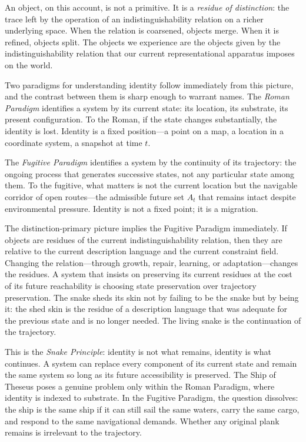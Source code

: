 \documentclass[12pt, letterpaper]{article}
\theoremstyle{remark}
\begin{document}
An object, on this account, is not a primitive.  It is a \emph{residue of
distinction}: the trace left by the operation of an indistinguishability
relation on a richer underlying space.  When the relation is coarsened,
objects merge.  When it is refined, objects split.  The objects we
experience are the objects given by the indistinguishability relation that
our current representational apparatus imposes on the world.

Two paradigms for understanding identity follow immediately from this
picture, and the contrast between them is sharp enough to warrant names.
The \emph{Roman Paradigm} identifies a system by its current state: its
location, its substrate, its present configuration.  To the Roman, if the
state changes substantially, the identity is lost.  Identity is a fixed
position---a point on a map, a location in a coordinate system, a snapshot
at time $t$.

The \emph{Fugitive Paradigm} identifies a system by the continuity of
its trajectory: the ongoing process that generates successive states, not
any particular state among them.  To the fugitive, what matters is not
the current location but the navigable corridor of open routes---the
admissible future set $A_t$ that remains intact despite environmental
pressure.  Identity is not a fixed point; it is a migration.

The distinction-primary picture implies the Fugitive Paradigm immediately.
If objects are residues of the current indistinguishability relation, then
they are relative to the current description language and the current
constraint field.  Changing the relation---through growth, repair, learning,
or adaptation---changes the residues.  A system that insists on preserving
its current residues at the cost of its future reachability is choosing
state preservation over trajectory preservation.  The snake sheds its skin
not by failing to be the snake but by being it: the shed skin is the
residue of a description language that was adequate for the previous
state and is no longer needed.  The living snake is the continuation of the
trajectory.

This is the \emph{Snake Principle}: identity is not what remains, identity
is what continues.  A system can replace every component of its current
state and remain the same system so long as its future accessibility is
preserved.  The Ship of Theseus poses a genuine problem only within the
Roman Paradigm, where identity is indexed to substrate.  In the Fugitive
Paradigm, the question dissolves: the ship is the same ship if it can still
sail the same waters, carry the same cargo, and respond to the same
navigational demands.  Whether any original plank remains is irrelevant to
the trajectory.
\end{document}

